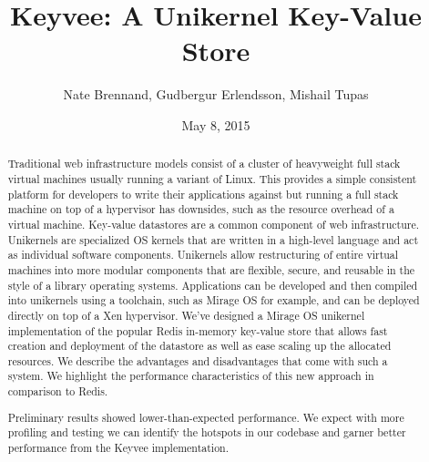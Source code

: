 \documentclass[english,10pt,twocolumn]{article}
\begin{document}
\title{Keyvee: A Unikernel Key-Value Store}
\author{Nate Brennand, Gudbergur Erlendsson, Mishail Tupas}
\date{May 8, 2015}
\maketitle
\thispagestyle{empty}


\begin{abstract}
Traditional web infrastructure models consist of a cluster of heavyweight full stack virtual machines usually running a variant of Linux.
This provides a simple consistent platform for developers to write their applications against but running a full stack machine on top of a hypervisor has downsides, such as the resource overhead of a virtual machine.
Key-value datastores are a common component of web infrastructure.
Unikernels are specialized OS kernels that are written in a high-level language and act as individual software components.
Unikernels allow restructuring of entire virtual machines into more modular components that are flexible, secure, and reusable in the style of a library operating systems. Applications can be developed and then compiled into unikernels using a toolchain, such as Mirage OS for example, and can be deployed directly on top of a Xen hypervisor.
We've designed a Mirage OS\cite{mirage} unikernel implementation of the popular Redis\cite{redis} in-memory key-value store that allows fast creation and deployment of the datastore as well as ease scaling up the allocated resources.
We describe the advantages and disadvantages that come with such a system.
We highlight the performance characteristics of this new approach in comparison to Redis.

Preliminary results showed lower-than-expected performance.
We expect with more profiling and testing we can identify the hotspots in our codebase and garner better performance from the Keyvee implementation.
\end{abstract}
\end{document}

